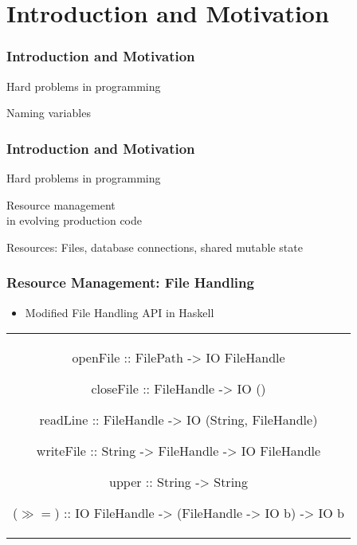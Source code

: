 \section{Introduction and Motivation}\label{sec:introduction}

\begin{frame}[c]
  \frametitle{Introduction and Motivation}
  {\large
    \begin{center}
      Hard problems in programming

      {\LARGE \color{red}Naming variables}
    \end{center}
    }
\end{frame}

\begin{frame}
  \frametitle{Introduction and Motivation}
  \begin{center}
    {\large Hard problems in programming}

    {\LARGE \color{red}Resource management}
    \\{\normalsize  in evolving production code}

    {\normalsize Resources: Files, database connections, shared mutable state}
\end{center}
\end{frame}

\begin{frame}[fragile, c]
  \frametitle{Resource Management: File Handling}
  \begin{center}
    \begin{itemize}
    \item Modified File Handling API in Haskell
    \end{itemize}
    \begin{tabular}[h]{c}
      \begin{haskell}

     openFile   :: FilePath   -> IO FileHandle

     closeFile  :: FileHandle -> IO ()

     readLine   :: FileHandle -> IO (String, FileHandle)

     writeFile  :: String     -> FileHandle
                              -> IO FileHandle


     upper      :: String     -> String

     ($\gg\!=$) :: IO FileHandle -> (FileHandle -> IO b) -> IO b
      \end{haskell}
    \end{tabular}
\end{center}
\end{frame}

